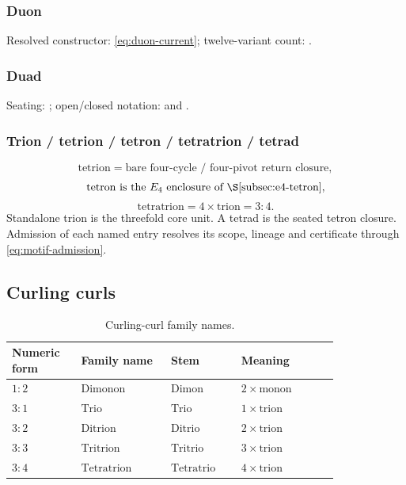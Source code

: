\subsubsection{Duon}
\label{app:cc-duon-duad-cycle}
Resolved constructor: \eqref{eq:duon-current}; twelve-variant count:
.

\subsubsection{Duad}
\label{app:cc-duad}
Seating: ; open/closed notation:
 and .

\subsubsection{Trion / tetrion / tetron / tetratrion / tetrad}
\label{app:cc-tetrion-tetron-tetratrion}
\[
\mathrm{tetrion}=\text{bare four-cycle / four-pivot return closure},
\]
\[
\mathrm{tetron}\ \text{is the }E_4\text{ enclosure of }\secref{subsec:e4-tetron},
\]
\[
\mathrm{tetratrion}=4\times\mathrm{trion}=3:4.
\]
Standalone trion is the threefold core unit. A tetrad is the seated tetron closure. Admission of each named entry resolves its scope, lineage and certificate through \eqref{eq:motif-admission}.

\subsection{Curling curls}
\label{app:cc-families}

\begin{table}[H]
\centering
\caption{Curling-curl family names.}
\label{tab:cc-families}
\renewcommand{\arraystretch}{1.18}
\begin{tabular}{@{}>{\raggedright\arraybackslash}p{0.16\linewidth}
                >{\raggedright\arraybackslash}p{0.23\linewidth}
                >{\raggedright\arraybackslash}p{0.18\linewidth}
                >{\raggedright\arraybackslash}p{0.25\linewidth}@{}}
\toprule
Numeric form & Family name & Stem & Meaning \\
\midrule
\(1:2\) & \(\mathrm{Dimonon}\) & \(\mathrm{Dimon}\) & \(2\times\mathrm{monon}\) \\
\(3:1\) & \(\mathrm{Trio}\) & \(\mathrm{Trio}\) & \(1\times\mathrm{trion}\) \\
\(3:2\) & \(\mathrm{Ditrion}\) & \(\mathrm{Ditrio}\) & \(2\times\mathrm{trion}\) \\
\(3:3\) & \(\mathrm{Tritrion}\) & \(\mathrm{Tritrio}\) & \(3\times\mathrm{trion}\) \\
\(3:4\) & \(\mathrm{Tetratrion}\) & \(\mathrm{Tetratrio}\) & \(4\times\mathrm{trion}\) \\
\bottomrule
\end{tabular}
\end{table}


